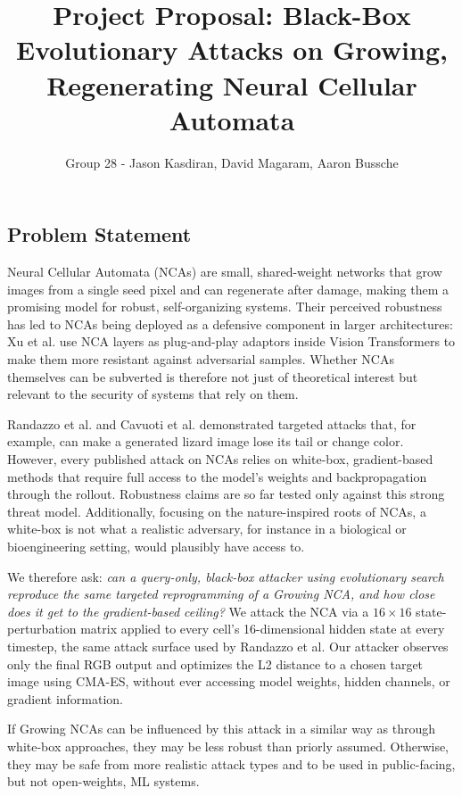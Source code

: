 \documentclass{article}
\title{Project Proposal: Black-Box Evolutionary Attacks on Growing, Regenerating Neural Cellular Automata}
\author{Group 28 - Jason Kasdiran, David Magaram, Aaron Bussche}
\begin{document}
	\maketitle

\listoftodos


\subsection*{Problem Statement}

Neural Cellular Automata (NCAs) are small, shared-weight networks that grow images from a single seed pixel and can regenerate after damage, making them a promising model for robust, self-organizing systems. Their perceived robustness has led to NCAs being deployed as a defensive component in larger architectures: Xu et al. \cite{xu2024adanca} use NCA layers as plug-and-play adaptors inside Vision Transformers to make them more resistant against adversarial samples. Whether NCAs themselves can be subverted is therefore not just of theoretical interest but relevant to the security of systems that rely on them.

Randazzo et al. \cite{randazzo2021adversarial} and Cavuoti et al. \cite{cavuoti2022adversarial} demonstrated targeted attacks that, for example, can make a generated lizard image lose its tail or change color. However, every published attack on NCAs relies on white-box, gradient-based methods that require full access to the model's weights and backpropagation through the rollout. Robustness claims are so far tested only against this strong threat model. Additionally, focusing on the nature-inspired roots of NCAs, a white-box is not what a realistic adversary, for instance in a biological or bioengineering setting, would plausibly have access to.

We therefore ask: \textit{can a query-only, black-box attacker using evolutionary search reproduce the same targeted reprogramming of a Growing NCA, and how close does it get to the gradient-based ceiling?} We attack the NCA via a $16 \times 16$ state-perturbation matrix applied to every cell's 16-dimensional hidden state at every timestep, the same attack surface used by Randazzo et al. Our attacker observes only the final RGB output and optimizes the L2 distance to a chosen target image using CMA-ES, without ever accessing model weights, hidden channels, or gradient information.

If Growing NCAs can be influenced by this attack in a similar way as through white-box approaches, they may be less robust than priorly assumed. Otherwise, they may be safe from more realistic attack types and to be used in public-facing, but not open-weights, ML systems.  
\end{document}
